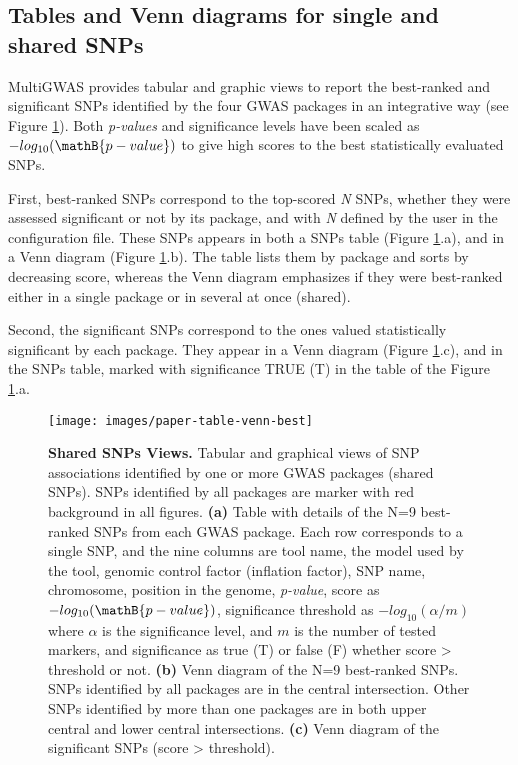 \subsection{Tables and Venn diagrams for single and shared SNPs}

MultiGWAS provides tabular and graphic views to report the best-ranked and significant SNPs identified by the four GWAS packages in an integrative way (see Figure \ref{fig:Table-Shared-SNPs}). Both \emph{p-values} and significance levels have been scaled as $-log_{10}(\mathB{p-value})$ to give high scores to the best statistically evaluated SNPs.

First, best-ranked SNPs correspond to the top-scored \emph{N} SNPs, whether they were assessed significant or not by its package, and with\emph{
N} defined by the user in the configuration file. These SNPs appears in both a SNPs table (Figure \ref{fig:Table-Shared-SNPs}.a), and in
a Venn diagram (Figure \ref{fig:Table-Shared-SNPs}.b). The table lists them by package and sorts by decreasing score, whereas the Venn diagram emphasizes if they were best-ranked either in a single package or in several at once (shared). 

Second, the significant SNPs correspond to the ones valued statistically significant by each package. They appear in a Venn diagram (Figure \ref{fig:Table-Shared-SNPs}.c), and in the SNPs table, marked with significance TRUE (T) in the table of the Figure \ref{fig:Table-Shared-SNPs}.a.

\begin{figure}[H]
\begin{centering}
\texttt{[image: images/paper-table-venn-best]}
\par\end{centering}
\caption{\textbf{Shared SNPs Views. } Tabular and graphical views of SNP associations identified by one or more GWAS packages (shared SNPs). SNPs identified by all packages are marker with red background in all figures. \textbf{(a)} Table with details of the N=9 best-ranked SNPs from each GWAS package. Each row corresponds to a single SNP, and the nine columns are tool name,
the model used by the tool, genomic control factor (inflation factor), SNP name, chromosome, position in the genome, \emph{p-value}, score
as $-log_{10}(\mathB{p-value})$, significance threshold as $-log_{10}(\alpha/m)$ where $\alpha$ is the significance level, and $m$ is the number of
tested markers, and significance as true (T) or false (F) whether score > threshold or not. \textbf{(b)} Venn diagram of the N=9 best-ranked SNPs. SNPs identified by all packages are in the central intersection. Other SNPs identified by more than one packages are in both upper central and lower central intersections. \textbf{(c)} Venn diagram of the significant SNPs (score > threshold). \label{fig:Table-Shared-SNPs}}
\end{figure}

